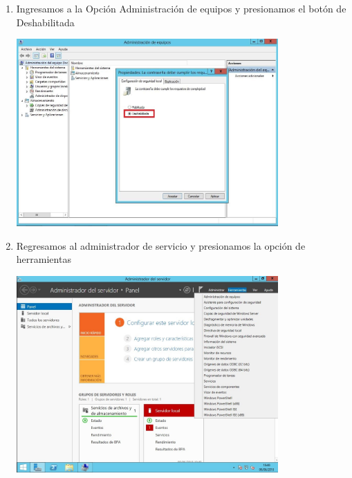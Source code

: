 \begin{enumerate}[1.]
	\hfill \break
	\hfill \break
	\hfill \break
	\hfill \break
	\hfill \break
	\hfill \break
	\hfill \break
	\hfill \break
	\hfill \break
	\hfill \break
	\item Ingresamos a la Opci\'on Administraci\'on de equipos y presionamos el bot\'on de Deshabilitada\\
	\begin{center}
	\includegraphics[width=10cm]{./Imagenes/img3} 
	\end{center}

	\item Regresamos al administrador de servicio y presionamos la opci\'on de herramientas\\
	\begin{center}
	\includegraphics[width=10cm]{./Imagenes/img4} 
	\end{center}


\end{enumerate}
